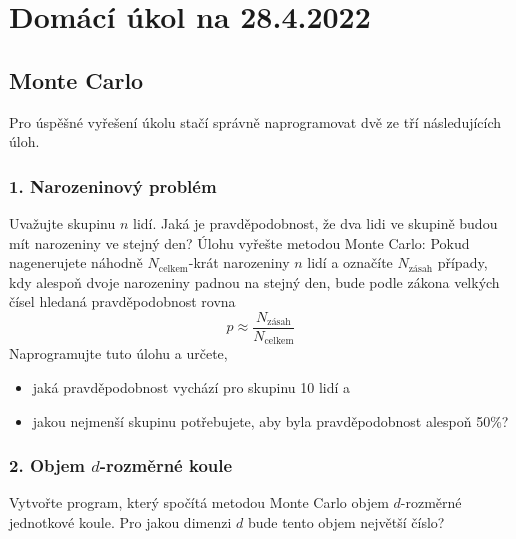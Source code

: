 \documentclass[a4paper,11pt,twoside]{article}
\begin{document}
\section*{Domácí úkol na 28.4.2022}
\subsection*{Monte Carlo}
Pro úspěšné vyřešení úkolu stačí správně naprogramovat dvě ze tří následujících úloh.
\subsubsection*{1. Narozeninový problém}
    Uvažujte skupinu $n$ lidí. 
    Jaká je pravděpodobnost, že dva lidi ve skupině budou mít narozeniny ve stejný den? 
    Úlohu vyřešte metodou Monte Carlo: 
    Pokud nagenerujete náhodně $N_\mathrm{celkem}$-krát narozeniny $n$ lidí a označíte $N_{\mathrm{zásah}}$ případy, kdy alespoň dvoje narozeniny padnou na stejný den, 
    bude podle zákona velkých čísel hledaná pravděpodobnost rovna
    \begin{equation*}
        p\approx\frac{N_{\mathrm{zásah}}}{N_{\mathrm{celkem}}}
    \end{equation*}
    Naprogramujte tuto úlohu a určete,

    \begin{itemize}
        \item jaká pravděpodobnost vychází pro skupinu 10 lidí a
        \item jakou nejmenší skupinu potřebujete, aby byla pravděpodobnost alespoň 50\%?
    \end{itemize}

\subsubsection*{2. Objem $d$-rozměrné koule}
    Vytvořte program, který spočítá metodou Monte Carlo objem $d$-rozměrné jednotkové koule.
    Pro jakou dimenzi $d$ bude tento objem největší číslo?
\end{document}
